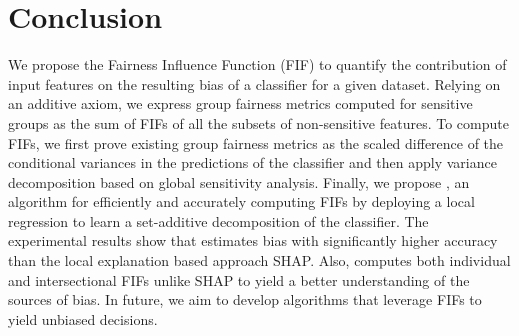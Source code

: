 \section{Conclusion}
We propose the Fairness Influence Function (FIF) to quantify the contribution of input features on the resulting bias of a classifier for a given dataset. Relying on an additive axiom, we express group fairness metrics computed for sensitive groups as the sum of FIFs of all the subsets of non-sensitive features. To compute FIFs, we first prove existing group fairness metrics as the scaled difference of the conditional variances in the predictions of the classifier and then apply variance decomposition based on global sensitivity analysis. Finally, we propose {\framework}, an algorithm for efficiently and accurately computing FIFs by deploying a local regression to learn a set-additive decomposition of the classifier. The experimental results show that {\framework} estimates bias with significantly higher accuracy than the local explanation based approach SHAP. Also, {\framework} computes both individual and intersectional FIFs unlike SHAP to yield a better understanding of the sources of bias.
In future,  we aim to develop algorithms that leverage FIFs to yield unbiased decisions.